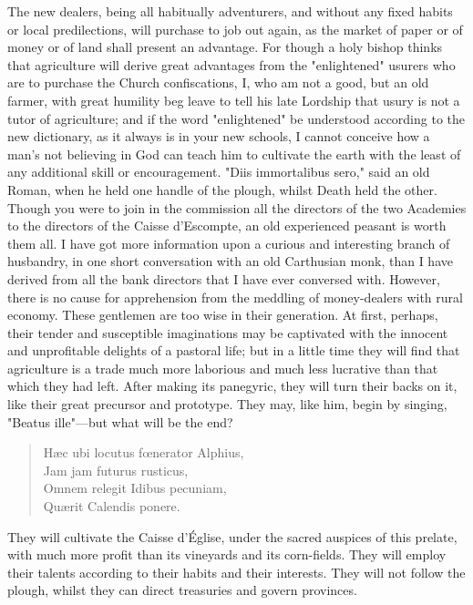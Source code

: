 The new dealers, being all habitually adventurers, and without any fixed habits or local predilections, will purchase to job out again, as the market of paper or of money or of land shall present an advantage. For though a holy bishop thinks that agriculture will derive great advantages from the "enlightened" usurers who are to purchase the Church confiscations, I, who am not a good, but an old farmer, with great humility beg leave to tell his late Lordship that usury is not a tutor of agriculture; and if the word "enlightened" be understood according to the new dictionary, as it always is in your new schools, I cannot conceive how a man's not believing in God can teach him to cultivate the earth with the least of any additional skill or encouragement. "Diis immortalibus sero," said an old Roman, when he held one handle of the plough, whilst Death held the other. Though you were to join in the commission all the directors of the two Academies to the directors of the Caisse d'Escompte, an old experienced peasant is worth them all. I have got more information upon a curious and interesting branch of husbandry, in one short conversation with an old Carthusian monk, than I have derived from all the bank directors that I have ever conversed with. However, there is no cause for apprehension from the meddling of money-dealers with rural economy. These gentlemen are too wise in their generation. At first, perhaps, their tender and susceptible imaginations may be captivated with the innocent and unprofitable delights of a pastoral life; but in a little time they will find that agriculture is a trade much more laborious and much less lucrative than that which they had left. After making its panegyric, they will turn their backs on it, like their great precursor and prototype. They may, like him, begin by singing, "Beatus ille"—but what will be the end?

\begin{verse}
Hæc ubi locutus fœnerator Alphius, \\
Jam jam futurus rusticus, \\
Omnem relegit Idibus pecuniam, \\
Quærit Calendis ponere.
\end{verse}

They will cultivate the Caisse d'Église, under the sacred auspices of this prelate, with much more profit than its vineyards and its corn-fields. They will employ their talents according to their habits and their interests. They will not follow the plough, whilst they can direct treasuries and govern provinces.

